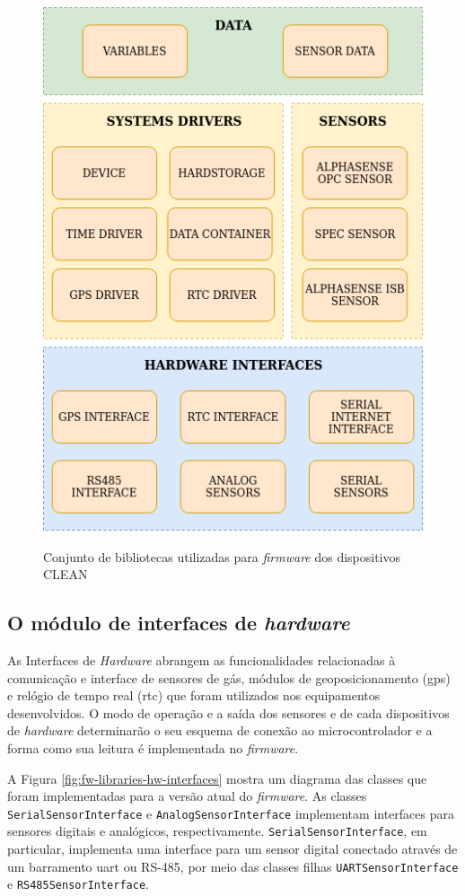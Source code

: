 \begin{figure}[h]
    \centering
    \caption{Conjunto de bibliotecas utilizadas para \textit{firmware} dos dispositivos CLEAN}
    \includegraphics[width=0.75\linewidth]{chapters//2-CLEAN/Figuras/Diagrama de bibliotecas.png}
    \label{fig:fw-libraries-structure}
\end{figure}

\subsection{O módulo de interfaces de \textit{hardware}}

As Interfaces de \textit{Hardware} abrangem as funcionalidades relacionadas à comunicação e interface de sensores de gás, módulos de geoposicionamento (\acrshort{gps}) e relógio de tempo real (\acrshort{rtc}) que foram utilizados nos equipamentos desenvolvidos. O modo de operação e a saída dos sensores e de cada dispositivos de \textit{hardware} determinarão o seu esquema de conexão ao microcontrolador e a forma como sua leitura é implementada no \textit{firmware}.

A Figura \ref{fig:fw-libraries-hw-interfaces} mostra um diagrama das classes que foram implementadas para a versão atual do \textit{firmware}. As classes \texttt{SerialSensorInterface} e \texttt{AnalogSensorInterface} implementam interfaces para sensores digitais e analógicos, respectivamente. \texttt{SerialSensorInterface}, em particular, implementa uma interface para um sensor digital conectado através de um barramento \acrshort{uart} ou RS-485, por meio das classes filhas \texttt{UARTSensorInterface} e \texttt{RS485SensorInterface}. 

